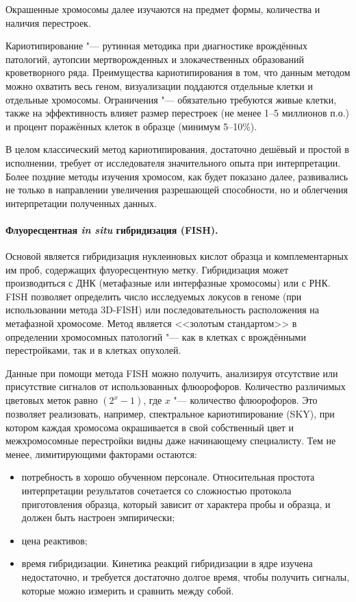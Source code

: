 \documentclass[a4paper,12pt]{article}
\begin{document}
Окрашенные хромосомы далее изучаются на предмет формы, количества и наличия перестроек.

Кариотипирование "--- рутинная методика при диагностике врождённых патологий, аутопсии мертворожденных и злокачественных образований кроветворного ряда.
Преимущества кариотипирования в том, что данным методом можно охватить весь геном, визуализации поддаются отдельные клетки и отдельные хромосомы.
Ограничения "--- обязательно требуются живые клетки, также на эффективность влияет размер перестроек (не менее 1--5 миллионов п.о.) и процент поражённых клеток в образце (минимум 5--10\%)\cite{Sampson_2014}.

В целом классический метод кариотипирования, достаточно дешёвый и простой в исполнении, требует от исследователя значительного опыта при интерпретации.
Более поздние методы изучения хромосом, как будет показано далее, развивались не только в направлении увеличения разрешающей способности, но и облегчения интерпретации полученных данных.

\paragraph{Флуоресцентная \textit{in situ} гибридизация (FISH).}
Основой является гибридизация нуклеиновых кислот образца и комплементарных им проб, содержащих флуоресцентную метку.
Гибридизация может производиться с ДНК (метафазные или интерфазные хромосомы) или с РНК.
FISH позволяет определить число исследуемых локусов в геноме (при использовании метода 3D-FISH) или последовательность расположения на метафазной хромосоме.
Метод является <<золотым стандартом>> в определении хромосомных патологий "--- как в клетках с врождёнными перестройками, так и в клетках опухолей.

Данные при помощи метода FISH можно получить, анализируя отсутствие или присутствие сигналов от использованных флюорофоров.
Количество различимых цветовых меток равно $(2^x - 1)$, где  $x$ "--- количество флюорофоров.
Это позволяет реализовать, например, спектральное кариотипирование (SKY), при котором каждая хромосома окрашивается в свой собственный цвет и межхромосомные перестройки видны даже начинающему специалисту\cite{Guo_2014}.
Тем не менее, лимитирующими факторами остаются:

\begin{itemize}
\item потребность в хорошо обученном персонале.
Относительная простота интерпретации результатов сочетается со сложностью протокола приготовления образца, который зависит от характера пробы и образца, и должен быть настроен эмпирически;
\item цена реактивов;
\item время гибридизации.
Кинетика реакций гибридизации в ядре изучена недостаточно, и требуется достаточно долгое время, чтобы получить сигналы, которые можно измерить и сравнить между собой.
\end{itemize}
\end{document}
